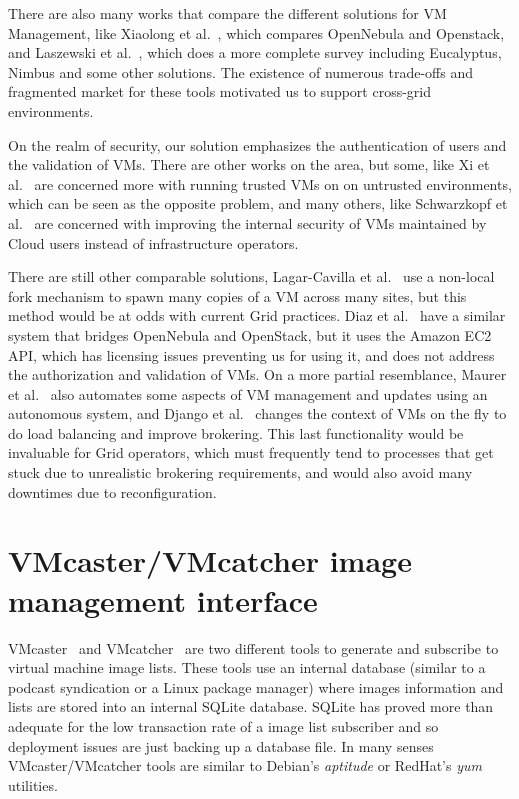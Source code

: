 \documentclass[oribibl]{llncs_Ibergrid2013}
\begin{document}
There are also many works that compare the different solutions for VM Management, like Xiaolong et al.~\cite{Xiaolong2012}, which compares OpenNebula and Openstack, and Laszewski et al.~\cite{Laszewski2012}, which does a more complete survey including Eucalyptus, Nimbus and some other solutions. The existence of numerous trade-offs and fragmented market for these tools motivated us to support cross-grid environments.

On the realm of security, our solution emphasizes the authentication of users and the validation of VMs. There are other works on the area, but some, like Xi et al.~\cite{Xi2012} are concerned more with running trusted VMs on on untrusted environments, which can be seen as the opposite problem, and many others, like Schwarzkopf et al.~\cite{Schwarzkopf2012} are concerned with improving the internal security of VMs maintained by Cloud users instead of infrastructure operators.

There are still other comparable solutions, Lagar-Cavilla et al.~\cite{Lagar-Cavilla2009} use a non-local fork mechanism to spawn many copies of a VM across many sites, but this method would be at odds with current Grid practices. Diaz et al.~\cite{Diaz2012} have a similar system that bridges OpenNebula and OpenStack, but it uses the Amazon EC2 API, which has licensing issues preventing us for using it, and does not address the authorization and validation of VMs. On a more partial resemblance, Maurer et al.~\cite{Maurer2013} also automates some aspects of VM management and updates using an autonomous system, and Django et al.~\cite{Django2013} changes the context of VMs on the fly to do load balancing and improve brokering. This last functionality would be invaluable for Grid operators, which must frequently tend to processes that get stuck due to unrealistic brokering requirements, and would also avoid many downtimes due to reconfiguration.



\section{VMcaster/VMcatcher image management interface}
\label{sect-vmcaster}
VMcaster~\cite{vmcaster} and VMcatcher~\cite{vmcatcher} are two different tools to generate and subscribe to virtual machine image lists.
These tools use an internal database (similar to a podcast syndication or a Linux package manager) where images information and lists are stored into an internal SQLite database.
SQLite has proved more than adequate for the low transaction rate of a image list subscriber and so deployment issues are just backing up a database file.
In many senses VMcaster/VMcatcher tools are similar to Debian's \textit{aptitude} or RedHat's \textit{yum} utilities. 
\end{document}
